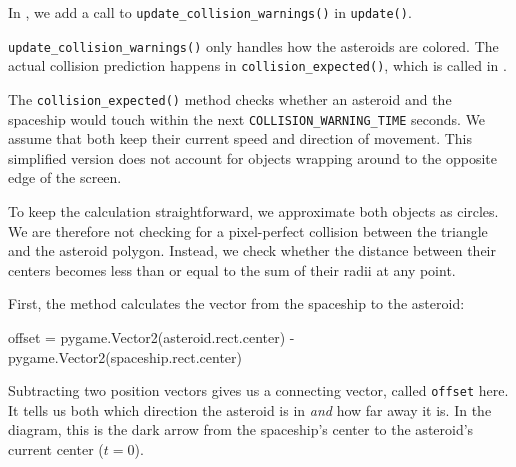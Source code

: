 
In , we add a call to \texttt{update\_collision\_warnings()} in \texttt{update()}.


\texttt{update\_collision\_warnings()} only handles how the asteroids are colored. The actual collision prediction happens in \texttt{collision\_expected()}, which is called in .


The \texttt{collision\_expected()} method checks whether an asteroid and the spaceship would touch within the next \texttt{COLLISION\_WARNING\_TIME} seconds. We assume that both keep their current speed and direction of movement. This simplified version does not account for objects wrapping around to the opposite edge of the screen.

\begin{hintbox}
	To keep the calculation straightforward, we approximate both objects as circles. We are therefore not checking for a pixel-perfect collision between the triangle and the asteroid polygon. Instead, we check whether the distance between their centers becomes less than or equal to the sum of their radii at any point.
\end{hintbox}

\newpage
First, the method calculates the vector from the spaceship to the asteroid:
\begin{codebox}
	offset = pygame.Vector2(asteroid.rect.center) - pygame.Vector2(spaceship.rect.center)
\end{codebox}

Subtracting two position vectors gives us a connecting vector, called \texttt{offset} here. It tells us both which direction the asteroid is in \emph{and} how far away it is. In the diagram, this is the dark arrow from the spaceship's center to the asteroid's current center ($t = 0$).

